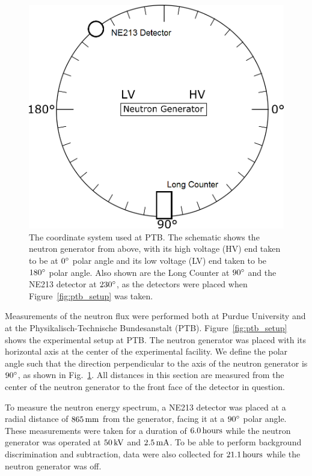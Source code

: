\begin{figure}[!htb]
\centering
    \includegraphics[width = 0.9\columnwidth, clip=true, trim= 0 0 0 0]{figures/ng/coordinate_schematic_v2_0} %
    \caption{The coordinate system used at PTB. The schematic shows the neutron generator from above, with its high voltage  (HV) end taken to be at $0{}^{\circ}$ polar angle and its low voltage (LV) end taken to be $180{}^{\circ}$ polar angle. Also shown are the Long Counter at $90{}^{\circ}$ and the NE213 detector at $230{}^{\circ}$, as the detectors were placed when Figure~\ref{fig:ptb_setup} was taken.}\label{fig:ptb_coordinates}
\end{figure}

Measurements of the neutron flux were performed both at Purdue University and at the Physikalisch-Technische Bundesanstalt (PTB). Figure~\ref{fig:ptb_setup} shows the experimental setup at PTB. The neutron generator was placed with its horizontal axis at the center of the experimental facility. We define the polar angle such that the direction perpendicular to the axis of the neutron generator is $90{}^{\circ}$, as shown in Fig.~\ref{fig:ptb_coordinates}. All distances in this section are measured from the center of the neutron generator to the front face of the detector in question.

To measure the neutron energy spectrum, a NE213 detector was placed at a radial distance of $865\,\mathrm{mm}$ from the generator, facing it at a $90{}^{\circ}$ polar angle. These measurements were taken for a duration of $6.0\,\mathrm{hours}$ while the neutron generator was operated at $50\,\mathrm{kV}$ and $2.5\,\mathrm{mA}$. To be able to perform background discrimination and subtraction, data were also collected for $21.1\,\mathrm{hours}$ while the neutron generator was off.

